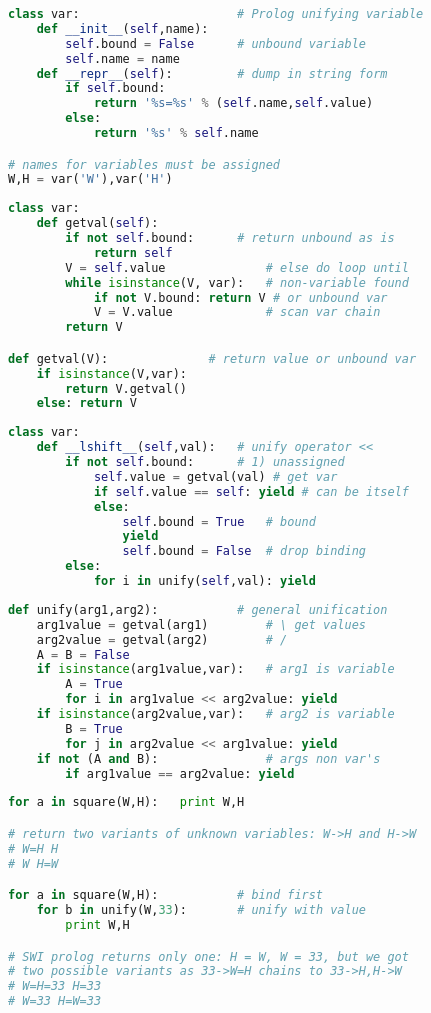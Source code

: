 \begin{lstlisting}[language=Python]
class var:						# Prolog unifying variable
	def __init__(self,name):
		self.bound = False      # unbound variable
		self.name = name
	def __repr__(self):         # dump in string form
		if self.bound:
			return '%s=%s' % (self.name,self.value)
		else:
			return '%s' % self.name

# names for variables must be assigned
W,H = var('W'),var('H') 
\end{lstlisting}
\clearpage
\begin{lstlisting}[language=Python]
class var:
	def getval(self):
		if not self.bound:		# return unbound as is
			return self
		V = self.value				# else do loop until
		while isinstance(V, var):	# non-variable found
			if not V.bound: return V # or unbound var
 			V = V.value				# scan var chain
		return V		

def getval(V):				# return value or unbound var
	if isinstance(V,var):
		return V.getval()
	else: return V
\end{lstlisting}
\clearpage
\begin{lstlisting}[language=Python]
class var:
	def __lshift__(self,val):   # unify operator <<
		if not self.bound:		# 1) unassigned
			self.value = getval(val) # get var
			if self.value == self: yield # can be itself
			else:
				self.bound = True	# bound
				yield
				self.bound = False	# drop binding
		else:
			for i in unify(self,val): yield
\end{lstlisting}
\clearpage
\begin{lstlisting}[language=Python]
def unify(arg1,arg2):			# general unification
	arg1value = getval(arg1)		# \ get values
	arg2value = getval(arg2)		# /
	A = B = False
	if isinstance(arg1value,var):	# arg1 is variable
		A = True
 		for i in arg1value << arg2value: yield
	if isinstance(arg2value,var):	# arg2 is variable
		B = True
 		for j in arg2value << arg1value: yield
	if not (A and B):				# args non var's
		if arg1value == arg2value: yield
\end{lstlisting}
\clearpage
\begin{lstlisting}[language=Python]
for a in square(W,H):	print W,H

# return two variants of unknown variables: W->H and H->W
# W=H H
# W H=W

for a in square(W,H):			# bind first
   	for b in unify(W,33):		# unify with value
 		print W,H

# SWI prolog returns only one: H = W, W = 33, but we got
# two possible variants as 33->W=H chains to 33->H,H->W		
# W=H=33 H=33
# W=33 H=W=33
\end{lstlisting}

